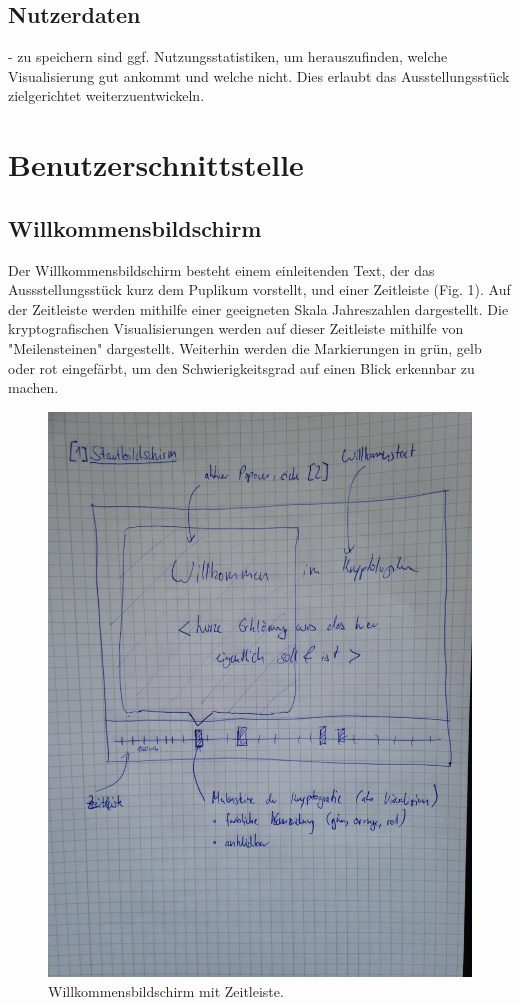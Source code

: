 \documentclass{article}
\begin{document}
\subsection{Nutzerdaten}

- zu speichern sind ggf. Nutzungsstatistiken, um herauszufinden, welche Visualisierung gut ankommt und welche nicht. 
Dies erlaubt das Ausstellungsstück zielgerichtet weiterzuentwickeln.

\section{Benutzerschnittstelle}

\subsection{Willkommensbildschirm}

Der Willkommensbildschirm besteht einem einleitenden Text, der das Aussstellungsstück kurz dem Puplikum vorstellt, und einer Zeitleiste (Fig. 1). Auf der Zeitleiste werden mithilfe einer geeigneten Skala Jahreszahlen dargestellt. Die kryptografischen Visualisierungen werden auf dieser Zeitleiste mithilfe von "Meilensteinen" dargestellt. Weiterhin werden die Markierungen in grün, gelb oder rot eingefärbt, um den Schwierigkeitsgrad auf einen Blick erkennbar zu machen.

\begin{figure}[H]
  \centering
    \includegraphics[width=\textwidth]{ui_welcome_main-draft.jpg}
  \caption{Willkommensbildschirm mit Zeitleiste.}
\end{figure}
\end{document}
